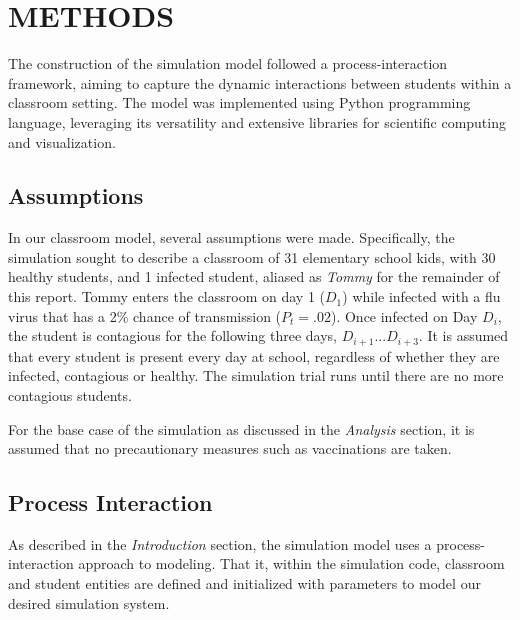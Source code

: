 \documentclass[
	letterpaper, %
]{jdf}
\begin{document}
\section{METHODS}
The construction of the simulation model followed a process-interaction framework, aiming to capture the dynamic interactions between students within a classroom setting. The model was implemented using Python programming language, leveraging its versatility and extensive libraries for scientific computing and visualization.

\subsection{Assumptions}
In our classroom model, several assumptions were made. Specifically, the simulation sought to describe a classroom of 31 elementary school kids, with 30 healthy students, and 1 infected student, aliased as \textit{Tommy} for the remainder of this report. Tommy enters the classroom on day 1 (\(D_1\)) while infected with a flu virus that has a 2\% chance of transmission (\(P_{t} = .02\)). Once infected on Day \(D_i\), the student is contagious for the following three days, \(D_{i+1} ... D_{i+3}\). It is assumed that every student is present every day at school, regardless of whether they are infected, contagious or healthy. The simulation trial runs until there are no more contagious students.

For the base case of the simulation as discussed in the \textit{Analysis} section, it is assumed that no precautionary measures such as vaccinations are taken.

\subsection{Process Interaction}
As described in the \textit{Introduction} section, the simulation model uses a process-interaction approach to modeling. That it, within the simulation code, classroom and student entities are defined and initialized with parameters to model our desired simulation system.
\end{document}
